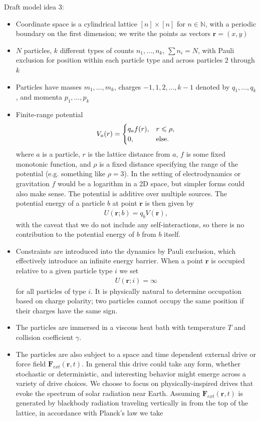 \documentclass[12pt,letterpaper]{article}
\newcommand{\mb}{\mathbf}
\begin{document}
Draft model idea 3:
\begin{itemize}
\item Coordinate space is a cylindrical lattice $[n] \times [n]$ for $n \in \mathbb{N}$, with a periodic boundary on the first dimension; we write the points as vectors $\mb{r} = (x, y)$
\item $N$ particles, $k$ different types of counts $n_{1}, \ldots, n_{k}$, $\sum n_{i} = N$, with Pauli exclusion for position within each particle type and across particles $2$ through $k$
\item Particles have masses $m_{1}, \ldots, m_{k}$, charges $-1, 1, 2, \ldots, k-1$ denoted by $q_{1}, \ldots, q_{k}$, and momenta $p_{1}, \ldots, p_{k}$
\item Finite-range potential
\begin{align*}
V_{a}(r) = \begin{cases}
q_{a}f(r), &r \leqslant \rho, \\
0, &\textnormal{else}.
\end{cases}
\end{align*}
where $a$ is a particle, $r$ is the lattice distance from $a$, $f$ is some fixed monotonic function, and $\rho$ is a fixed distance specifying the range of the potential (e.g. something like $\rho = 3$). In the setting of electrodynamics or gravitation $f$ would be a logarithm in a 2D space, but simpler forms could also make sense. The potential is additive over multiple sources. The potential energy of a particle $b$ at point $\mb{r}$ is then given by
\begin{align*}
U(\mb{r}; b) = q_{b}V(\mb{r}),
\end{align*}
with the caveat that we do not include any self-interactions, so there is no contribution to the potential energy of $b$ from $b$ itself.
\item Constraints are introduced into the dynamics by Pauli exclusion, which effectively introduce an infinite energy barrier. When a point $\mb{r}$ is occupied relative to a given particle type $i$ we set
\begin{align*}
U(\mb{r}; i) = \infty
\end{align*}
for all particles of type $i$. It is physically natural to determine occupation based on charge polarity; two particles cannot occupy the same position if their charges have the same sign.
\item The particles are immersed in a viscous heat bath with temperature $T$ and collision coefficient $\gamma$.
\item The particles are also subject to a space and time dependent external drive or force field $\mb{F}_{ext}(\mb{r}, t)$. In general this drive could take any form, whether stochastic or deterministic, and interesting behavior might emerge across a variety of drive choices. We choose to focus on physically-inspired drives that evoke the spectrum of solar radiation near Earth. Assuming $\mb{F}_{ext}(\mb{r}, t)$ is generated by blackbody radiation traveling vertically in from the top of the lattice, in accordance with Planck's law we take

\end{itemize}
\end{document}
